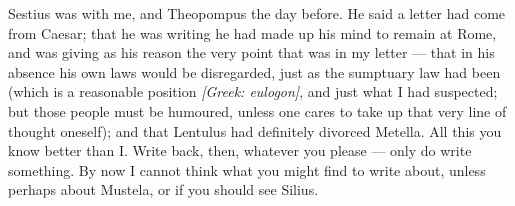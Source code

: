

 Sestius was with me, and Theopompus the day before. He said a letter had come from Caesar; that he was writing he had made up his mind to remain at Rome, and was giving as his reason the very point that was in my letter --- that in his absence his own laws would be disregarded, just as the sumptuary law had been (which is a reasonable position \textit{[Greek: eulogon]}, and just what I had suspected; but those people must be humoured, unless one cares to take up that very line of thought oneself); and that Lentulus had definitely divorced Metella. All this you know better than I. Write back, then, whatever you please --- only do write something. By now I cannot think what you might find to write about, unless perhaps about Mustela, or if you should see Silius.

